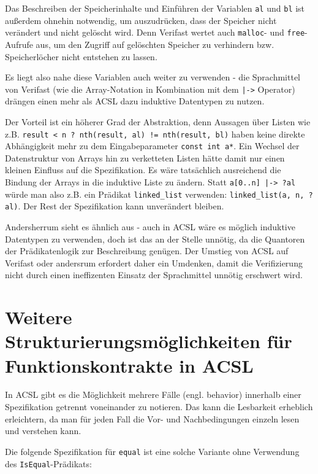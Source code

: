 Das Beschreiben der Speicherinhalte und Einführen der Variablen  \lstinline{al} und \lstinline{bl} ist außerdem
ohnehin notwendig, um auszudrücken, dass der Speicher nicht verändert und nicht gelöscht wird. Denn Verifast wertet
auch \lstinline{malloc}- und \lstinline{free}-Aufrufe aus, um den Zugriff auf gelöschten Speicher zu verhindern bzw.
Speicherlöcher nicht entstehen zu lassen.

Es liegt also nahe diese Variablen auch weiter zu verwenden - die Sprachmittel von Verifast (wie die Array-Notation in Kombination mit dem
\lstinline{|->} Operator) drängen einen mehr als ACSL dazu induktive Datentypen zu nutzen.

Der Vorteil ist ein höherer Grad der Abstraktion, denn Aussagen über Listen wie z.B.
\lstinline{result < n ? nth(result, al) != nth(result, bl)} haben keine direkte Abhängigkeit mehr zu
dem Eingabeparameter \lstinline{const int a*}. Ein Wechsel der Datenstruktur von Arrays
hin zu verketteten Listen hätte damit nur einen kleinen Einfluss auf die Spezifikation. Es wäre tatsächlich 
ausreichend die Bindung der Arrays in die induktive Liste zu ändern. Statt \lstinline{a[0..n] |-> ?al} würde man also
z.B. ein Prädikat \lstinline{linked_list} verwenden: \lstinline{linked_list(a, n, ?al)}. Der Rest der 
Spezifikation kann unverändert bleiben.

Andersherrum sieht es ähnlich aus - auch in ACSL wäre es möglich induktive Datentypen zu verwenden, doch
ist das an der Stelle unnötig, da die Quantoren der Prädikatenlogik zur Beschreibung genügen. 
Der Umstieg von ACSL auf Verifast oder andersrum erfordert daher ein Umdenken, damit die Verifizierung 
nicht durch einen ineffizenten Einsatz der Sprachmittel unnötig erschwert wird.



\section{Weitere Strukturierungsmöglichkeiten für Funktionskontrakte in ACSL}
\label{sec:design-by-contract:behaviors}

In ACSL gibt es die Möglichkeit mehrere Fälle (engl. behavior) innerhalb einer Spezifikation getrennt voneinander zu
notieren. Das kann die Lesbarkeit erheblich erleichtern, da man für jeden Fall die Vor- und Nachbedingungen
einzeln lesen und verstehen kann.

Die folgende Spezifikation für \texttt{equal} ist eine solche Variante ohne Verwendung des 
\lstinline{IsEqual}-Prädikats:

